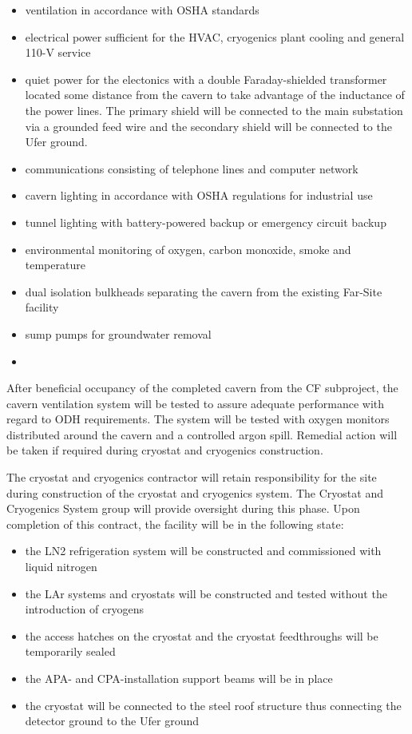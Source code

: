 \begin{itemize}
\item ventilation in accordance with OSHA standards
\item electrical power sufficient for the HVAC, cryogenics plant cooling and general 110-V service
\item quiet power for the electonics with a double Faraday-shielded transformer located some distance  from the cavern to take advantage of the inductance of the power lines. The primary shield will be connected to the main substation via a grounded feed wire and the secondary shield will be connected to the Ufer ground.
\item communications consisting of telephone lines and computer network
\item cavern lighting in accordance with OSHA regulations for industrial use
\item tunnel lighting with battery-powered backup or emergency circuit backup
\item environmental monitoring of oxygen, carbon monoxide, smoke and temperature
\item dual isolation bulkheads separating the cavern from the existing Far-Site facility
\item sump pumps for groundwater removal
\item {}
\end{itemize}

After beneficial occupancy of the completed cavern from the 
CF subproject, the cavern ventilation system will be tested to assure adequate performance with regard to ODH requirements. The system will be tested with oxygen monitors distributed around the cavern and a controlled argon spill. Remedial action will be taken if required during cryostat and cryogenics construction.

The cryostat and cryogenics contractor will retain responsibility for the site during construction of the cryostat and cryogenics system. The Cryostat and Cryogenics System group will provide oversight during this phase. Upon completion of this contract, the facility will be in the following state:

\begin{itemize}
\item the LN2 refrigeration system will be constructed and commissioned with liquid nitrogen
\item the LAr systems and cryostats will be constructed and tested without the introduction of cryogens \item the access hatches on the cryostat and the cryostat feedthroughs will be temporarily sealed
\item the APA- and CPA-installation support beams will be in place
\item the cryostat will be connected to the steel roof structure thus connecting the detector ground to the Ufer ground
\end{itemize}

